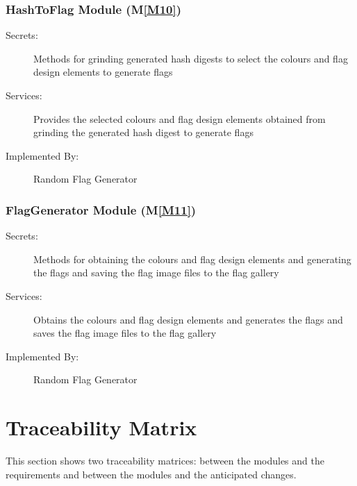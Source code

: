 \documentclass[12pt, titlepage]{article}
\newcommand{\mref}[1]{M\ref{#1}}
\begin{document}
\subsubsection{HashToFlag Module (\mref{M10})}

\begin{description}
\item[Secrets:] Methods for grinding generated hash digests to select the
  colours and flag design elements to generate flags
\item[Services:] Provides the selected colours and flag design elements
  obtained from grinding the generated hash digest to generate flags
\item[Implemented By:] Random Flag Generator
\end{description}

\subsubsection{FlagGenerator Module (\mref{M11})}

\begin{description}
\item[Secrets:] Methods for obtaining the colours and flag design elements and
  generating the flags and saving the flag image files to the flag gallery
\item[Services:] Obtains the colours and flag design elements and generates
  the flags and saves the flag image files to the flag gallery
\item[Implemented By:] Random Flag Generator
\end{description}

\section{Traceability Matrix} \label{SecTM}

This section shows two traceability matrices: between the modules and the
requirements and between the modules and the anticipated changes.
\end{document}

